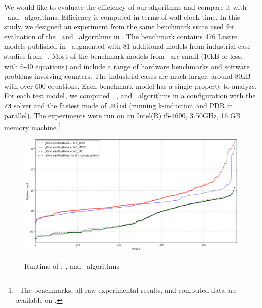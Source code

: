 
\newcommand{\takeaway}[1]{
\vspace{6pt}
\noindent\fbox{\parbox{\textwidth}{#1}}
\vspace{6pt}
}

 We would like to evaluate the efficiency
 of our algorithms and compare it with \ucalg ~and \ucbfalg ~algorithms.
 Efficiency is computed in terms of wall-clock time.
 In this study, we designed an experiment from 
 the same benchmark suite used for evaluation of the \ucalg ~and \ucbfalg ~algorithms in \cite{Ghass16}.
 The benchmark contains 476 Lustre models 
 published in~\cite{Hagen08:FMCAD} augmented
with 81 additional models from industrial case studies from ~\cite{QFCS15:backes,hilt2013}.
 Most of
the benchmark models from~\cite{Hagen08:FMCAD} are small (10kB or less,
with 6-40 equations) and include a range of hardware benchmarks and
software problems involving counters.
The industrial cases are much
larger: around 80kB with over 600 equations.  
Each benchmark model has a single property to analyze. 
For each test model, we computed \aivcalg , \ucalg , and \ucbfalg ~algorithms
in a configuration with
the \texttt{Z3} solver and the fastest mode of \texttt{JKind} (running k-induction and PDR in parallel). The experiments
were run on an  Intel(R) i5-4690, 3.50GHz,
16 GB memory machine.\footnote{\noindent ~The benchmarks, all raw experimental results,
  and computed data are available on \cite{expr}.}

\begin{figure}[t]
 \centering
  \includegraphics[width=\textwidth]{figs/performance-sorted.png}
  \label{fig:performance}
  \vspace{-0.2in}
  \caption{Runtime of \aivcalg, \ucbfalg, and \ucalg ~algorithms}
\end{figure}

